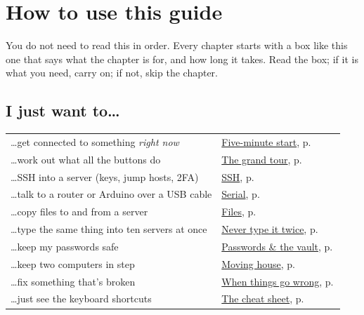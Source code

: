 \documentclass[11pt,oneside,openany]{book}
\begin{document}
\makecover
\setcounter{page}{1}

\chapter*{How to use this guide}

\begin{tldr}
You do not need to read this in order. Every chapter starts with a box like this one that says what the
chapter is for, and how long it takes. Read the box; if it is what you need, carry on; if not, skip the chapter.
\end{tldr}

\section*{I just want to\dots}
\begin{tabularx}{\linewidth}{@{}X>{\raggedleft\arraybackslash}p{52mm}@{}}
  \toprule
  \dots get connected to something \emph{right now} & \hyperref[ch:start]{Five-minute start}, p.\,\pageref{ch:start}\\
  \dots work out what all the buttons do & \hyperref[ch:tour]{The grand tour}, p.\,\pageref{ch:tour}\\
  \dots SSH into a server (keys, jump hosts, 2FA) & \hyperref[ch:ssh]{SSH}, p.\,\pageref{ch:ssh}\\
  \dots talk to a router or Arduino over a USB cable & \hyperref[ch:serial]{Serial}, p.\,\pageref{ch:serial}\\
  \dots copy files to and from a server & \hyperref[ch:files]{Files}, p.\,\pageref{ch:files}\\
  \dots type the same thing into ten servers at once & \hyperref[ch:repeat]{Never type it twice}, p.\,\pageref{ch:repeat}\\
  \dots keep my passwords safe & \hyperref[ch:secrets]{Passwords \& the vault}, p.\,\pageref{ch:secrets}\\
  \dots keep two computers in step & \hyperref[ch:move]{Moving house}, p.\,\pageref{ch:move}\\
  \dots fix something that's broken & \hyperref[ch:trouble]{When things go wrong}, p.\,\pageref{ch:trouble}\\
  \dots just see the keyboard shortcuts & \hyperref[app:keys]{The cheat sheet}, p.\,\pageref{app:keys}\\
  \bottomrule
\end{tabularx}
\end{document}
